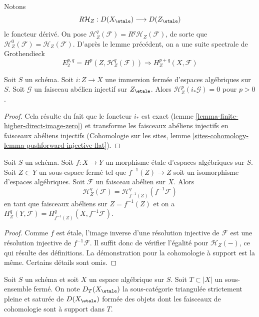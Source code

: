 \noindent
Notons
$$
R\mathcal{H}_Z : D(X_\etale) \longrightarrow D(Z_\etale)
$$
le foncteur dérivé. On pose
$\mathcal{H}^q_Z(\mathcal{F}) = R^q\mathcal{H}_Z(\mathcal{F})$, de sorte que
$\mathcal{H}^0_Z(\mathcal{F}) = \mathcal{H}_Z(\mathcal{F})$.
D'après le lemme précédent, on a une suite spectrale de Grothendieck
$$
E_2^{p, q} = H^p(Z, \mathcal{H}^q_Z(\mathcal{F}))
\Rightarrow H^{p + q}_Z(X, \mathcal{F})
$$

\begin{lemma}
\label{lemma-cohomology-with-support-sheaf-on-support}
Soit $S$ un schéma. Soit $i : Z \to X$ une immersion fermée
d'espaces algébriques sur $S$. Soit $\mathcal{G}$ un faisceau abélien injectif
sur $Z_\etale$. Alors $\mathcal{H}^p_Z(i_*\mathcal{G}) = 0$ pour $p > 0$.
\end{lemma}

\begin{proof}
Cela résulte du fait que le foncteur $i_*$ est exact
(lemme \ref{lemma-finite-higher-direct-image-zero}) et transforme
les faisceaux abéliens injectifs en faisceaux abéliens injectifs
(Cohomologie sur les sites, lemme
\ref{sites-cohomology-lemma-pushforward-injective-flat}).
\end{proof}

\begin{lemma}
\label{lemma-etale-localization-sheaf-with-support}
Soit $S$ un schéma. Soit $f : X \to Y$ un morphisme \'etale
d'espaces algébriques sur $S$. Soit $Z \subset Y$ un sous-espace fermé
tel que $f^{-1}(Z) \to Z$ soit un isomorphisme d'espaces algébriques.
Soit $\mathcal{F}$ un faisceau abélien sur $X$. Alors
$$
\mathcal{H}^q_Z(\mathcal{F}) = \mathcal{H}^q_{f^{-1}(Z)}(f^{-1}\mathcal{F})
$$
en tant que faisceaux abéliens sur $Z = f^{-1}(Z)$ et on
a $H^q_Z(Y, \mathcal{F}) = H^q_{f^{-1}(Z)}(X, f^{-1}\mathcal{F})$.
\end{lemma}

\begin{proof}
Comme $f$ est \'etale, l'image inverse d'une résolution injective de $\mathcal{F}$
est une résolution injective de $f^{-1}\mathcal{F}$.
Il suffit donc de vérifier l'égalité pour $\mathcal{H}_Z(-)$,
ce qui résulte des définitions. La démonstration pour la cohomologie à
support est la même. Certains détails sont omis.
\end{proof}

\noindent
Soit $S$ un schéma et soit $X$ un espace algébrique sur $S$.
Soit $T \subset |X|$ un sous-ensemble fermé.
On note $D_T(X_\etale)$ la
sous-catégorie triangulée strictement pleine et saturée de $D(X_\etale)$
formée des objets dont les faisceaux de cohomologie sont à support dans $T$.

